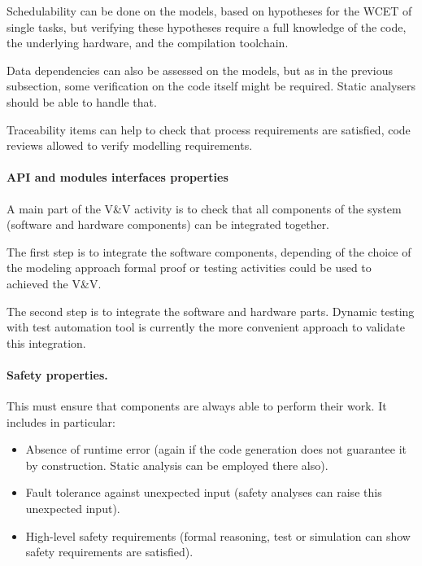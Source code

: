 \documentclass{template/openetcs_article}
\begin{document}
Schedulability can be done on the models, based on hypotheses for the WCET of
single tasks, but verifying these hypotheses require a full knowledge of
the code, the underlying hardware, and the compilation toolchain.

Data dependencies can also be assessed on the models, but as in the previous
subsection, some verification on the code itself might be required. Static
analysers should be able to handle that.

Traceability  items can help  to  check  that process requirements are satisfied, code reviews allowed to  verify modelling requirements.

\paragraph{API and modules interfaces properties}

A main part of the V\&V activity is to check that all components of the system (software and hardware components) can be integrated together.

The first step  is to integrate the software components, depending of the choice of the modeling approach  formal proof or testing activities could be used to achieved the V\&V.

The second step is to  integrate the software and hardware parts. Dynamic
testing with test automation tool  is currently  the more convenient approach  to  validate this integration.


\paragraph{Safety properties.}

This must ensure that components are always able to perform their work.
It includes in particular:
\begin{itemize}
  \item Absence of runtime error (again if the code generation does
        not guarantee it by construction. Static analysis can be employed
        there also).
  \item Fault tolerance against unexpected input (safety analyses can raise this unexpected input).
  \item High-level safety requirements (formal reasoning, test or simulation can show safety requirements are satisfied).
\end{itemize}
\end{document}

